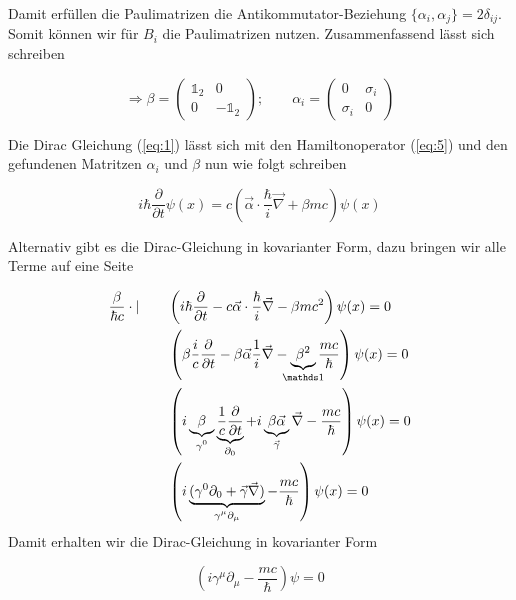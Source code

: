 Damit erfüllen die Paulimatrizen die Antikommutator-Beziehung  \(\{\alpha_i,\alpha_j\} =2\delta_{ij} \). Somit können wir für \(B_i\) die Paulimatrizen nutzen. Zusammenfassend lässt sich schreiben

\begin{equation}
  \label{eq:15}
  \Rightarrow \boxed{ \beta= \begin{pmatrix}\mathbb 1_2&0\\ 0&-\mathbb 1_2\end{pmatrix};\qquad \alpha_i=\begin{pmatrix} 0&\sigma_i\\ \sigma_i&0\end{pmatrix} }
\end{equation}


Die Dirac Gleichung (\ref{eq:1}) lässt sich mit den Hamiltonoperator (\ref{eq:5}) und den gefundenen Matritzen \(\alpha_i\) und \(\beta\) nun wie folgt schreiben

\begin{equation}
  \label{eq:16}
  \boxed{i\hbar \frac{\partial}{\partial t}\psi(x) = c\left(\vec \alpha\cdot\frac{\hbar}{i}\vec \nabla + \beta mc\right)\psi(x)}
\end{equation}


Alternativ gibt es die Dirac-Gleichung in kovarianter Form, dazu bringen wir alle Terme auf eine Seite


\begin{align}
  \label{eq:20}
 \frac{\beta}{\hbar c} \cdot| \qquad  &\left( i\hbar \frac{\partial}{\partial t} - c \vec \alpha\cdot\frac{\hbar}{i}\vec \nabla - \beta mc^2 \right)\psi(x) = 0  \notag \\
 &\left( \beta\frac{i}{c} \frac{\partial}{\partial t} - \beta\vec\alpha\frac{1}{i}\vec \nabla  - \underbr{\beta^2}_{\mathds 1} \frac{mc}{\hbar } \right)\psi(x) = 0 \notag\\
 &\left( i \underbr{ \beta}_{\gamma^0}  \underbr{ \frac{1}{c} \frac{\partial}{\partial t}}_{\partial_0} + i\underbr{ \beta \vec \alpha }_{\vec \gamma}\vec \nabla -  \frac{mc}{\hbar } \right)\psi(x) = 0 \notag\\
 &\left( i \underbr{(\gamma^0  \partial_0 + \vec \gamma \vec \nabla)}_{\gamma^\mu\partial_\mu} -  \frac{mc}{\hbar } \right)\psi(x) = 0 \notag\\
\end{align}
Damit erhalten wir die Dirac-Gleichung in kovarianter Form

\begin{equation}
  \label{eq:17}
  \boxed{\left(i\gamma^\mu\partial_\mu - \frac{mc}{\hbar}\right)\psi=0}
\end{equation}


